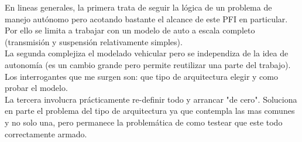 \documentclass[12pt,a4paper,fleqn]{report}
\begin{document}
En lineas generales, la primera trata de seguir la lógica de un problema de manejo autónomo pero acotando bastante el alcance de este PFI en particular. Por ello se limita a trabajar con un modelo de auto a escala completo (transmisión y suspensión relativamente simples).\vspace{5pt} \\
La segunda complejiza el modelado vehicular pero se independiza de la idea de autonomía (es un cambio grande pero permite reutilizar una parte del trabajo). Los interrogantes que me surgen son: que tipo de arquitectura elegir y como probar el modelo. \vspace{5pt}\\
La tercera involucra prácticamente re-definir todo y arrancar "de cero". Soluciona en parte el problema del tipo de arquitectura ya que contempla las mas comunes y no solo una, pero permanece la problemática de como testear que este todo correctamente armado.











	
	
	
	
	
	
	
	
	
	
	
	
	
\end{document}
